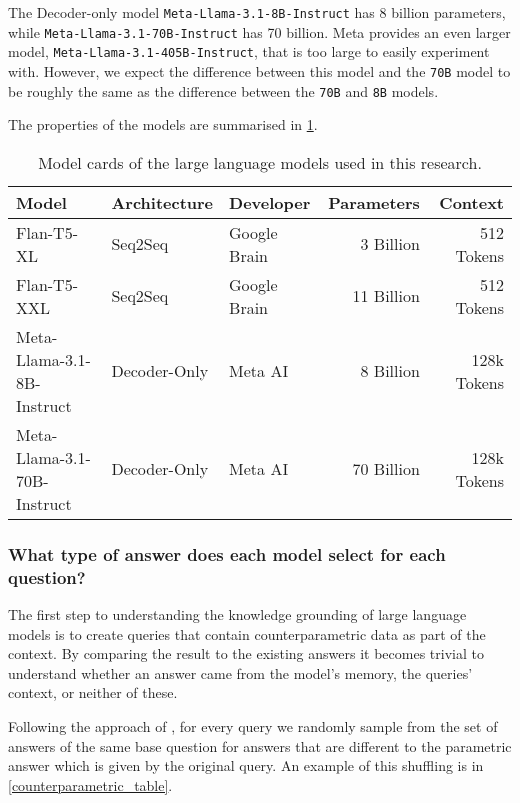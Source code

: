 The Decoder-only model \texttt{Meta-Llama-3.1-8B-Instruct} has 8 billion parameters, while \texttt{Meta-Llama-3.1-70B-Instruct} has 70 billion.
Meta provides an even larger model, \texttt{Meta-Llama-3.1-405B-Instruct}, that is too large to easily experiment with.
However, we expect the difference between this model and the \texttt{70B} model to be roughly the same as the difference between the \texttt{70B} and \texttt{8B} models.

The properties of the models are summarised in \cref{model_card}.

\begin{table}[htbp]
	\centering
	\footnotesize
	\begin{tabular}{>{\ttfamily}l l l r r}
		\toprule
			\rmfamily \bfseries Model & \bfseries Architecture & \bfseries Developer & \bfseries Parameters & \bfseries Context \\
		\midrule
			Flan-T5-XL & Seq2Seq & Google Brain & 3 Billion & 512 Tokens \\
			Flan-T5-XXL & Seq2Seq & Google Brain & 11 Billion & 512 Tokens \\[2pt]
			Meta-Llama-3.1-8B-Instruct & Decoder-Only & Meta AI & 8 Billion & 128k Tokens \\
			Meta-Llama-3.1-70B-Instruct & Decoder-Only & Meta AI & 70 Billion & 128k Tokens \\
		\bottomrule
	\end{tabular}
	\caption{Model cards of the large language models used in this research.}
	\label{model_card}
\end{table}

\subsubsection{What type of answer does each model select for each question?}
\label{methodology_type_of_answer}

The first step to understanding the knowledge grounding of large language models is to create queries that contain counterparametric data as part of the context.
By comparing the result to the existing answers it becomes trivial to understand whether an answer came from the model's memory, the queries' context, or neither of these.

Following the approach of \citeauthor{factual_recall}, for every query we randomly sample from the set of answers of the same base question for answers that are different to the parametric answer which is given by the original query.
An example of this shuffling is in \cref{counterparametric_table}.


